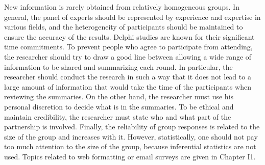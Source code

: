 \documentclass [7pt]{beamer}
\begin{document}
\begin{frame}
\justifying
New information is rarely obtained from relatively homogeneous groups. In general, the panel of experts should be represented by experience and expertise in various fields, and the heterogeneity of participants should be maintained to ensure the accuracy of the results. Delphi studies are known for their significant time commitments. To prevent people who agree to participate from attending, the researcher should try to draw a good line between allowing a wide range of information to be shared and summarizing each round. In particular, the researcher should conduct the research in such a way that it does not lead to a large amount of information that would take the time of the participants when reviewing the summaries. On the other hand, the researcher must use his personal discretion to decide what is in the summaries. To be ethical and maintain credibility, the researcher must state who and what part of the partnership is involved. Finally, the reliability of group responses is related to the size of the group and increases with it. However, statistically, one should not pay too much attention to the size of the group, because inferential statistics are not used. Topics related to web formatting or email surveys are given in Chapter I1.
\end{frame}
\end{document}
